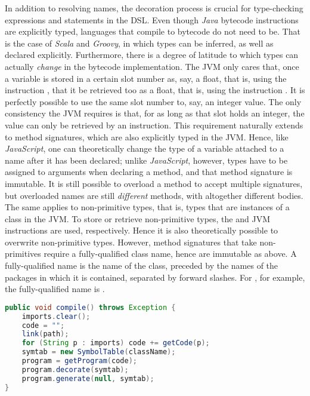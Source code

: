 In addition to resolving names, the decoration process is crucial for type-checking expressions and statements in the DSL. Even though \emph{Java} bytecode instructions are explicitly typed, languages that compile to bytecode do not need to be. That is the case of \emph{Scala} and \emph{Groovy}, in which types can be inferred, as well as declared explicitly. Furthermore, there is a degree of latitude to which types can actually \emph{change} in the bytecode implementation. The JVM only cares that, once a variable is stored in a certain slot number as, say, a float, that is, using the instruction , that it be retrieved too as a float, that is, using the instruction . It is perfectly possible to use the same slot number to, say,  an integer value. The only consistency the JVM requires is that, for as long as that slot holds an integer, the value can only be retrieved by an  instruction. This requirement naturally extends to method signatures, which are also explicitly typed in the JVM. Hence, like \emph{JavaScript}, one can theoretically change the type of a variable attached to a name after it has been declared; unlike \emph{JavaScript}, however, types have to be assigned to arguments when declaring a method, and that method signature is immutable. It is still possible to overload a method to accept multiple signatures, but overloaded names are still \emph{different} methods, with altogether different bodies. The same applies to non-primitive types, that is, types that are instances of a class in the JVM. To store or retrieve non-primitive types, the  and  JVM instructions are used, respectively. Hence it is also theoretically possible to overwrite non-primitive types. However, method signatures that take non-primitives require a fully-qualified class name, hence are immutable as above. A fully-qualified name is the name of the class, preceded by the names of the packages in which it is contained, separated by forward slashes. For , for example, the fully-qualified name is .

\begin{lstlisting}[language=Java,caption={Triggering the compilation process of a \emph{Scandal} program.},label={alg:compile}]
public void compile() throws Exception {
	imports.clear();
	code = "";
	link(path);
	for (String p : imports) code += getCode(p);
	symtab = new SymbolTable(className);
	program = getProgram(code);
	program.decorate(symtab);
	program.generate(null, symtab);
}
\end{lstlisting}

